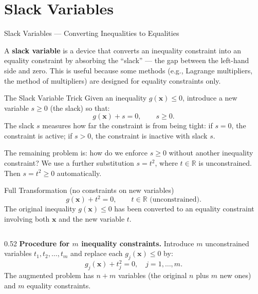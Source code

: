 \documentclass[aspectratio=169,10pt]{beamer}
\newcommand{\R}{\mathbb{R}}
\newcommand{\bx}{\mathbf{x}}
\begin{document}
\section{Slack Variables}

\begin{frame}[allowframebreaks]{Slack Variables --- Converting Inequalities to Equalities}

  A \textbf{slack variable} is a device that converts an inequality constraint
  into an equality constraint by absorbing the ``slack'' --- the gap between
  the left-hand side and zero.  This is useful because some methods (e.g.,
  Lagrange multipliers, the method of multipliers) are designed for equality
  constraints only.

  \begin{block}{The Slack Variable Trick}
    Given an inequality $g(\bx) \le 0$, introduce a new variable $s \ge 0$
    (the slack) so that:
    \[
      g(\bx) + s = 0, \qquad s \ge 0.
    \]
    The slack $s$ measures how far the constraint is from being tight:
    if $s = 0$, the constraint is active; if $s > 0$, the constraint is
    inactive with slack $s$.
  \end{block}

  The remaining problem is: how do we enforce $s \ge 0$ without another
  inequality constraint?  We use a further substitution $s = t^2$, where
  $t \in \R$ is unconstrained.  Then $s = t^2 \ge 0$ automatically.

  \begin{block}{Full Transformation (no constraints on new variables)}
    \[
      g(\bx) + t^2 = 0, \qquad t \in \R \text{ (unconstrained)}.
    \]
    The original inequality $g(\bx) \le 0$ has been converted to an equality
    constraint involving both $\bx$ and the new variable $t$.
  \end{block}

  \framebreak

  \begin{columns}
    \begin{column}{0.52\textwidth}
      \textbf{Procedure for $m$ inequality constraints.}  Introduce $m$
      unconstrained variables $t_1, t_2, \ldots, t_m$ and replace each
      $g_j(\bx) \le 0$ by:
      \[
        g_j(\bx) + t_j^2 = 0, \quad j = 1, \ldots, m.
      \]
      The augmented problem has $n + m$ variables (the original $n$ plus $m$
      new ones) and $m$ equality constraints.


\end{column}
\end{columns}
\end{frame}
\end{document}
